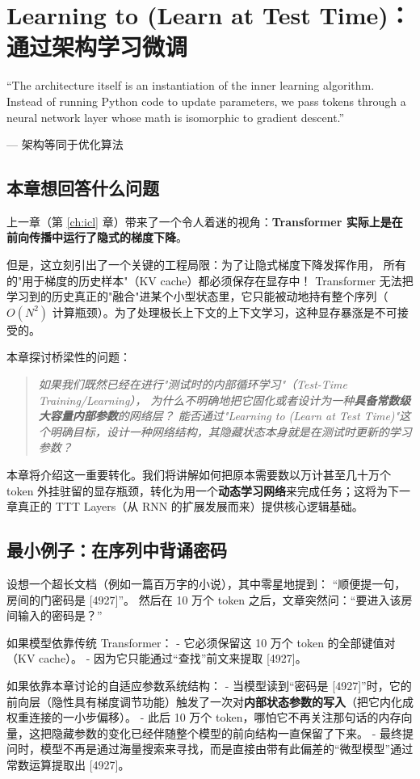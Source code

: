 \chapter{Learning to (Learn at Test Time)：通过架构学习微调}
\label{ch:ttt_bridge}

\epigraph{``The architecture itself is an instantiation of the inner learning algorithm. Instead of running Python code to update parameters, we pass tokens through a neural network layer whose math is isomorphic to gradient descent.''}{--- 架构等同于优化算法}

\section{本章想回答什么问题}

上一章（第 \ref{ch:icl} 章）带来了一个令人着迷的视角：\textbf{Transformer 实际上是在前向传播中运行了隐式的梯度下降}。

但是，这立刻引出了一个关键的工程局限：为了让隐式梯度下降发挥作用，
所有的"用于梯度的历史样本"（KV cache）都必须保存在显存中！
Transformer 无法把学习到的历史真正的"融合"进某个小型状态里，它只能被动地持有整个序列（$O(N^2)$ 计算瓶颈）。为了处理极长上下文的上下文学习，这种显存暴涨是不可接受的。

本章探讨桥梁性的问题：
\begin{quote}
\textit{如果我们既然已经在进行"测试时的内部循环学习"（Test-Time Training/Learning），
为什么不明确地把它固化或者设计为一种\textbf{具备常数级大容量内部参数}的网络层？
能否通过"Learning to (Learn at Test Time)"这个明确目标，设计一种网络结构，其隐藏状态本身就是在测试时更新的学习参数？}
\end{quote}

本章将介绍这一重要转化。我们将讲解如何把原本需要数以万计甚至几十万个 token 外挂驻留的显存瓶颈，转化为用一个\textbf{动态学习网络}来完成任务；这将为下一章真正的 TTT Layers（从 RNN 的扩展发展而来）提供核心逻辑基础。

\section{最小例子：在序列中背诵密码}
\label{sec:l2l_minimal}

\begin{toybox}[title=玩具问题 D：长序列中的隐性规则修改]
设想一个超长文档（例如一篇百万字的小说），其中零星地提到：
“顺便提一句，房间的门密码是 [4927]”。
然后在 10 万个 token 之后，文章突然问：“要进入该房间输入的密码是？”

如果模型依靠传统 Transformer：
- 它必须保留这 10 万个 token 的全部键值对（KV cache）。
- 因为它只能通过“查找”前文来提取 [4927]。

如果依靠本章讨论的自适应参数系统结构：
- 当模型读到“密码是 [4927]”时，它的前向层（隐性具有梯度调节功能）触发了一次对\textbf{内部状态参数的写入}（把它内化成权重连接的一小步偏移）。
- 此后 10 万个 token，哪怕它不再关注那句话的内存向量，这把隐藏参数的变化已经伴随整个模型的前向结构一直保留了下来。
- 最终提问时，模型不再是通过海量搜索来寻找，而是直接由带有此偏差的“微型模型”通过常数运算提取出 [4927]。
\end{toybox}

